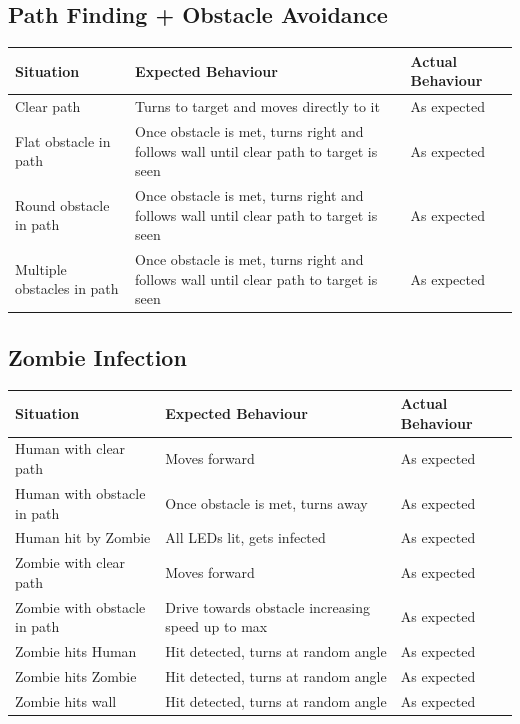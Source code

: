 \documentclass[11pt]{article}
\begin{document}
\subsection*{Path Finding + Obstacle Avoidance}

 \begin{center}
\begin{tabular}{ | p{5cm} | p{5cm} | p{5cm} |}
	\hline
	\textbf{Situation} & \textbf{Expected Behaviour} & \textbf{Actual Behaviour} \\
    \hline
	Clear path & Turns to target and moves directly to it & As expected \\
	\hline
	Flat obstacle in path & Once obstacle is met, turns right and follows wall until clear path to target is seen & As expected \\
	\hline
	Round obstacle in path & Once obstacle is met, turns right and follows wall until clear path to target is seen & As 	expected \\
	\hline
	Multiple obstacles in path & Once obstacle is met, turns right and follows wall until clear path to target is seen & As expected\\
	\hline
\end{tabular}
\end{center}

\subsection*{Zombie Infection}

 \begin{center}
\begin{tabular}{ | p{5cm} | p{5cm} | p{5cm} |}
	\hline
	\textbf{Situation} & \textbf{Expected Behaviour} & \textbf{Actual Behaviour} \\
    \hline
	Human with clear path & Moves forward & As expected \\
	\hline
	Human with obstacle in path & Once obstacle is met, turns away & As expected \\
	\hline 
	Human hit by Zombie & All LEDs lit, gets infected & As expected \\
	\hline 
	Zombie with clear path & Moves forward &As expected \\
	\hline 
	Zombie with obstacle in path & Drive towards obstacle increasing speed up to max & As expected \\
	\hline 
	Zombie hits Human & Hit detected, turns at random angle & As expected \\
	\hline 
	Zombie hits Zombie & Hit detected, turns at random angle & As expected \\
	\hline 
	Zombie hits wall & Hit detected, turns at random angle & As expected \\
	\hline 
\end{tabular}
\end{center}
\end{document}
